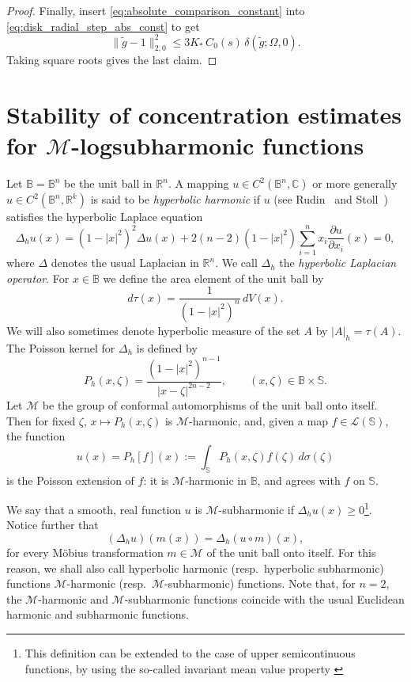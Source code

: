 \documentclass[a4paper,10pt]{amsart}
\begin{document}
\begin{proof}
Finally, insert \eqref{eq:absolute_comparison_constant} into
\eqref{eq:disk_radial_step_abs_const} to get
\[
\|\widetilde g-1\|_{2,0}^2
\le
3K_\ast\,C_0(s)\,\delta(\widetilde g;\Omega,0).
\]
Taking square roots gives the last claim.
\end{proof}



\section[Stability of Faber-Krahn]{Stability of concentration estimates for \texorpdfstring{$\mathcal{M}$}{M}-logsubharmonic functions}

Let $\mathbb{B}=\mathbb{B}^{n}$ be the unit ball in $\mathbb{R}^{n}$.
A mapping $u\in C^{2}(\mathbb{B}^{n}, \mathbb{C})$ or more generally
$u\in C^{2}(\mathbb{B}^{n}, \mathbb{R}^k)$ is said to be \emph{hyperbolic harmonic}
if $u$ (see Rudin~\cite{rudin} and Stoll~\cite{stoll}) satisfies the hyperbolic Laplace equation
\begin{equation}\label{hyphar}
\Delta_{h}u(x)=(1-|x|^2)^2\Delta u(x)
+2(n-2)(1-|x|^2)\sum_{i=1}^{n} x_{i} \frac{\partial u}{\partial x_{i}}(x)=0,
\end{equation}
where $\Delta$ denotes the usual Laplacian in $\mathbb{R}^{n}$.
We call $\Delta_{h}$ the \emph{hyperbolic Laplacian operator}.
For $x\in \mathbb{B}$ we define the area element of the unit ball by
\begin{equation}\label{eq:invariant-measure-hyperbolic}
d\tau(x) = \frac{1}{(1-|x|^2)^n}\, dV(x).
\end{equation}
We will also sometimes denote hyperbolic measure of the set $A$ by $|A|_h= \tau(A)$.
The Poisson kernel for $\Delta_h$ is defined by
\[
P_h(x,\zeta)=\frac{(1-|x|^2)^{n-1}}{|x-\zeta|^{2n-2}}, \qquad (x,\zeta)\in \mathbb{B}\times \mathbb{S}.
\]
Let $\mathcal{M}$ be the group of conformal automorphisms of the unit ball onto itself.
Then for fixed $\zeta$, $x\mapsto P_h(x,\zeta)$ is $\mathcal{M}$-harmonic, and, given a map
$f\in \mathcal{L}(\mathbb{S})$, the function
\[
u(x) = P_h[f](x):=\int_{\mathbb{S}}P_h(x,\zeta) f(\zeta)\, d\sigma(\zeta)
\]
is the Poisson extension of $f$: it is $\mathcal{M}$-harmonic in $\mathbb{B}$, and agrees with $f$ on $\mathbb{S}$.

We say that a smooth, real function $u$ is $\mathcal{M}$-subharmonic if $\Delta_h u(x) \ge 0$\footnote{This definition can be extended to the case of upper semicontinuous functions, by using the so-called invariant mean value property \cite{stoll}}.
Notice further that
\begin{equation}\label{fol}
(\Delta_h u)(m(x)) =\Delta_h (u\circ m)(x),
\end{equation}
for every M\"obius transformation $m\in\mathcal{M}$ of the unit ball onto itself.
For this reason, we shall also call hyperbolic harmonic (resp.\ hyperbolic subharmonic)
functions $\mathcal{M}$-harmonic (resp.\ $\mathcal{M}$-subharmonic) functions.
Note that, for $n=2$, the $\mathcal{M}$-harmonic and $\mathcal{M}$-subharmonic functions
coincide with the usual Euclidean harmonic and subharmonic functions.
\end{document}
